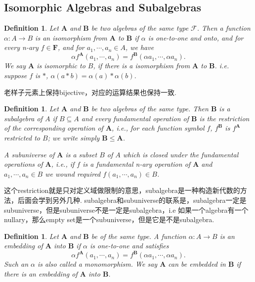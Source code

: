 \documentclass{article}
\newtheorem{definition}[theorem]{Definition}
\newcommand*{\xfunc}[4]{{#2}\colon{#3}{#1}{#4}}
\newcommand*{\func}[3]{\xfunc{\to}{#1}{#2}{#3}}
\begin{document}
\newpage
\subsection{Isomorphic Algebras and Subalgebras}

\begin{definition}
\rm Let $\mathbf{A}$ and $\mathbf{B}$ be two algebras of the {\color{red} same type} $\mathcal{F}$. Then a function $\func{\alpha}{A}{B}$ is an {\color{red} isomorphism} from $\mathbf{A}$ to $\mathbf{B}$ if $\alpha$ is one-to-one and onto, and for every n-ary $f \in \mathbf{F}$, and for $a_1,\cdots,a_n \in A$, we have
$$
\alpha f^\mathbf{A}(a_1,\cdots,a_n) = f^\mathbf{B}(\alpha a_1,\cdots,\alpha a_n).
$$
We say $\mathbf{A}$ is isomorphic to $B$, if there is a isomorphism from $\mathbf{A}$ to $\mathbf{B}$. i.e. suppose $f$ is  $*$, $\alpha(a * b) = \alpha(a) * \alpha(b)$. 
\end{definition}

{\color{blue} 老样子元素上保持bijective，对应的运算结果也保持一致}.

\begin{definition}
\rm Let $\mathbf{A}$ and $\mathbf{B}$ be two algebras of the same type. Then $\mathbf{B}$ is a {\color{red} subalgebra} of $A$ if $B \subseteq A$ and every fundamental operation of $\mathbf{B}$ is the restriction of the corresponding operation of $\mathbf{A}$, i.e., for each function symbol $f$, $f^\mathbf{B}$ is $f^\mathbf{A}$ restricted to $B$; we write simply $\mathbf{B} \leq \mathbf{A}$.

A {\color{red} subuniverse} of $\mathbf{A}$ is a subset $B$ of $A$ which is closed under the fundamental operations of $\mathbf{A}$, i.e., if $f$ is a fundamental n-ary operation of $\mathbf{A}$ and $a_1,\cdots,a_n \in B$ we wound required $f(a_1,\cdots,a_n) \in B$. 
\end{definition}

{\color{blue} 这个restriction就是只对定义域做限制的意思，subalgebra是一种构造新代数的方法，后面会学到另外几种. subalgebra和subuniverse的联系是，subalgebra一定是subuniverse，但是subuniverse不是一定是subalgebra，i.e 如果一个algebra有一个nullary，那么empty set是一个subuniverse，但是它是不是subalgebra}.

\begin{definition}
\rm Let $\mathbf{A}$ and $\mathbf{B}$ be of the same type. A function $\func{\alpha}{A}{B}$ is an embedding of $\mathbf{A}$ into $\mathbf{B}$ if $\alpha$ is one-to-one and satisfies
$$
\alpha f^\mathbf{A}(a_1,\cdots,a_n) = f^\mathbf{B}(\alpha a_1,\cdots,\alpha a_n).
$$
Such an $\alpha$ is also called a monomorphism. We say $\mathbf{A}$ can be embedded in $\mathbf{B}$ if there is an embedding of $\mathbf{A}$ into $\mathbf{B}$.
\end{definition}
\end{document}
